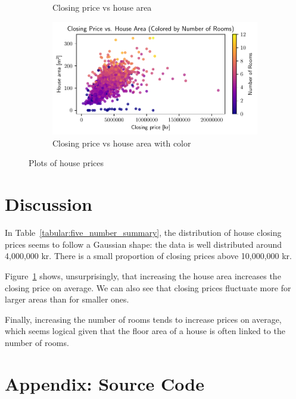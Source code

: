\documentclass[a4paper]{article}
\begin{document}
\begin{figure}
\begin{subfigure}[b]{\textwidth}
      \caption{Closing price vs house area}
      \label{fig:closing_price_house_ares}
  \end{subfigure}
  \vfill
  \begin{subfigure}[c]{\textwidth}
      \centering
      \includegraphics[width=\textwidth]{closing_price_house_ares_color.pdf}
      \caption{Closing price vs house area with color}
      \label{fig:closing_price_house_ares_color}
  \end{subfigure}
     \caption{Plots of house prices}
     \label{fig:house_plots}
\end{figure}


\newpage

\section*{Discussion}

In Table~\ref{tabular:five_number_summary}, the distribution of house closing prices seems to follow a Gaussian shape: the data is well distributed around 4,000,000 kr.
There is a small proportion of closing prices above 10,000,000 kr.

Figure~\ref{fig:closing_price_house_ares} shows, unsurprisingly, that increasing the house area increases the closing price on average.
We can also see that closing prices fluctuate more for larger areas than for smaller ones.

Finally, increasing the number of rooms tends to increase prices on average, which seems logical given that the floor area of a house is often linked to the number of rooms.

\newpage


\printbibliography

\section*{Appendix: Source Code}




\end{document}
